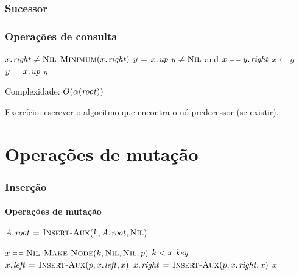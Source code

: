 \documentclass{beamer}
\begin{document}
\begin{frame}

\frametitle{Sucessor}
\frametitle{Operações de consulta}

\begin{codebox}
  \zi {}
  \li \If $\attrib{x}{right} \neq \const{Nil}$
  \li \Then \Return $\proc{Minimum}(\attrib{x}{right})$
      \End
  \li $y \gets \attrib{x}{up}$
  \li \While $y \neq \textnormal{\scshape Nil}$ and $x \isequal \attrib{y}{right}$
  \li \Do $x \gets y$
  \li   $y \gets \attrib{x}{up}$
      \End
  \li \Return $y$
\end{codebox}

Complexidade: $O(\alpha(\id{root}))$
\pause

Exercício: escrever o algoritmo que encontra o nó predecessor (se existir).

\end{frame}


\section{Operações de mutação}

\begin{frame}

\frametitle{Inserção}
\framesubtitle{Operações de mutação}

\begin{codebox}
  \zi {}
  \li $\attrib{A}{root} \gets \proc{Insert-Aux}(k, \attrib{A}{root}, \const{Nil})$
  \zi {}
\end{codebox}

\begin{codebox}
  \zi {}
  \zi {}
  \zi {}
  \li \If $x \isequal \const{Nil}$
  \li \Then \Return $\proc{Make-Node}(k, \const{Nil}, \const{Nil}, \id{p})$
  \li \Else
  \li    \If $k < \attrib{x}{key}$
  \li    \Then $\attrib{x}{left} \gets \proc{Insert-Aux}(p, \attrib{x}{left}, x)$
  \li    \Else $\attrib{x}{right} \gets \proc{Insert-Aux}(p, \attrib{x}{right}, x)$
         \End
  \li    \Return $x$
       \End
\end{codebox}

\end{frame}
\end{document}
